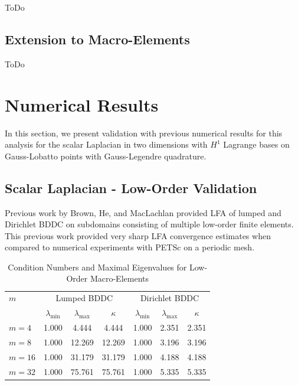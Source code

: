 \documentclass[review]{siamart190516}
\begin{document}
ToDo

\subsection{Extension to Macro-Elements}\label{sec:previouswork}

ToDo

\section{Numerical Results}\label{sec:results}

In this section, we present validation with previous numerical results for this analysis for the scalar Laplacian in two dimensions with $H^1$ Lagrange bases on Gauss-Lobatto points with Gauss-Legendre quadrature.

\subsection{Scalar Laplacian - Low-Order Validation}\label{sec:lowordervalidate}

Previous work by Brown, He, and MacLachlan \cite{brown2019local} provided LFA of lumped and Dirichlet BDDC on subdomains consisting of multiple low-order finite elements.
This previous work provided very sharp LFA convergence estimates when compared to numerical experiments with PETSc \cite{petsc-user-ref} on a periodic mesh.

\begin{table}[ht!]
\begin{center}
\begin{tabular}{l ccc ccc}
  \toprule
  $m$  &  \multicolumn{3}{c}{Lumped BDDC}  &  \multicolumn{3}{c}{Dirichlet BDDC}  \\
                      &  $\lambda_{\min}$  &  $\lambda_{\max}$  &  $\kappa$ & $\lambda_{\min}$  &  $\lambda_{\max}$ & $\kappa$  \\
  \toprule
  $m = 4$   &  1.000  &   4.444  &   4.444  &  1.000  &  2.351  &  2.351  \\
  $m = 8$   &  1.000  &  12.269  &  12.269  &  1.000  &  3.196  &  3.196  \\
  $m = 16$  &  1.000  &  31.179  &  31.179  &  1.000  &  4.188  &  4.188  \\
  $m = 32$  &  1.000  &  75.761  &  75.761  &  1.000  &  5.335  &  5.335  \\
  \bottomrule
\end{tabular}
\end{center}
\caption{Condition Numbers and Maximal Eigenvalues for Low-Order Macro-Elements}
\label{table:macro_element_bddc}
\end{table}
\end{document}
